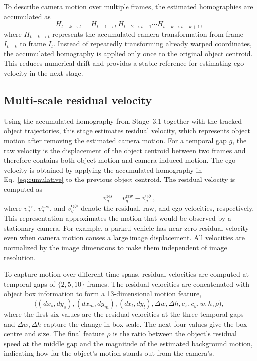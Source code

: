 \documentclass[sigconf,anonymous,nonacm]{acmart}
\begin{document}
To describe camera motion over multiple frames, the estimated homographies are accumulated as
\begin{equation}
H_{t-k\to t} = H_{t-1\to t}\, H_{t-2\to t-1} \cdots H_{t-k\to t-k+1},
\label{eq:cumulative}
\end{equation}
where $H_{t-k\to t}$ represents the accumulated camera transformation from frame $I_{t-k}$ to frame $I_t$. Instead of repeatedly transforming already warped coordinates, the accumulated homography is applied only once to the original object centroid. This reduces numerical drift and provides a stable reference for estimating ego velocity in the next stage.

\subsection{Multi-scale residual velocity}
\label{sec:residual}

Using the accumulated homography from Stage~3.1 together with the tracked object trajectories, this stage estimates residual velocity, which represents object motion after removing the estimated camera motion. For a temporal gap $g$, the raw velocity is the displacement of the object centroid between two frames and therefore contains both object motion and camera-induced motion. The ego velocity is obtained by applying the accumulated homography in Eq.~\ref{eq:cumulative} to the previous object centroid. The residual velocity is computed as
\begin{equation}
v^{\mathrm{res}}_{g} = v^{\mathrm{raw}}_{g} - v^{\mathrm{ego}}_{g},
\label{eq:residual}
\end{equation}
where $v^{\mathrm{res}}_g$, $v^{\mathrm{raw}}_g$, and $v^{\mathrm{ego}}_g$ denote the residual, raw, and ego velocities, respectively. This representation approximates the motion that would be observed by a stationary camera. For example, a parked vehicle has near-zero residual velocity even when camera motion causes a large image displacement. All velocities are normalized by the image dimensions to make them independent of image resolution.

To capture motion over different time spans, residual velocities are computed at temporal gaps of $\{2,5,10\}$ frames. The residual velocities are concatenated with object box information to form a 13-dimensional motion feature,
\begin{equation}
\bigl((dx_s,dy_s),(dx_m,dy_m),(dx_l,dy_l),\Delta w,\Delta h,c_x,c_y,w,h,\rho\bigr),
\label{eq:descriptor}
\end{equation}
where the first six values are the residual velocities at the three temporal gaps and $\Delta w, \Delta h$ capture the change in box scale. The next four values give the box centre and size. The final feature $\rho$ is the ratio between the object's residual speed at the middle gap and the magnitude of the estimated background motion, indicating how far the object's motion stands out from the camera's.
\end{document}
